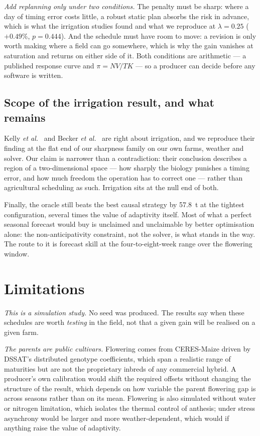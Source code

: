 \documentclass[10pt,twocolumn]{article}
\begin{document}
\emph{Add replanning only under two conditions.} The penalty must
be sharp: where a day of timing error costs little, a robust static
plan absorbs the risk in advance, which is what the irrigation
studies found and what we reproduce at
$\lambda = 0.25$ ($+0.49$\%,
$p = 0.444$). And the schedule must have room to move: a revision
is only worth making where a field can go somewhere, which is why
the gain vanishes at saturation and returns on either side of it.
Both conditions are arithmetic --- a published response curve and
$\pi = NV/TK$ --- so a producer can decide before any software is
written.

\subsection{Scope of the irrigation result, and what remains}

Kelly \textit{et al.}~\cite{kelly2023} and Becker \textit{et
al.}~\cite{becker2026} are right about irrigation, and we reproduce
their finding at the flat end of our sharpness family on our own
farms, weather and solver. Our claim is narrower than a
contradiction: their conclusion describes a region of a
two-dimensional space --- how sharply the biology punishes a timing
error, and how much freedom the operation has to correct one ---
rather than agricultural scheduling as such. Irrigation sits at the
null end of both.

Finally, the oracle still beats the best causal strategy by
57.8~t at the tightest configuration, several times the value
of adaptivity itself. Most of what a perfect seasonal forecast would
buy is unclaimed and unclaimable by better optimisation alone: the
non-anticipativity constraint, not the solver, is what stands in the
way. The route to it is forecast skill at the four-to-eight-week
range over the flowering window.


\section{Limitations}
\label{sec:limits}

\emph{This is a simulation study.} No seed was produced. The results say
when these schedules are worth \emph{testing} in the field, not that a given
gain will be realised on a given farm.

\emph{The parents are public cultivars.} Flowering comes from CERES-Maize
driven by DSSAT's distributed genotype coefficients, which span a realistic
range of maturities but are not the proprietary inbreds of any commercial
hybrid. A producer's own calibration would shift the required offsets without
changing the structure of the result, which depends on how variable the
parent flowering gap is across seasons rather than on its mean. Flowering is
also simulated without water or nitrogen limitation, which isolates the
thermal control of anthesis; under stress asynchrony would be larger and more
weather-dependent, which would if anything raise the value of adaptivity.
\end{document}
